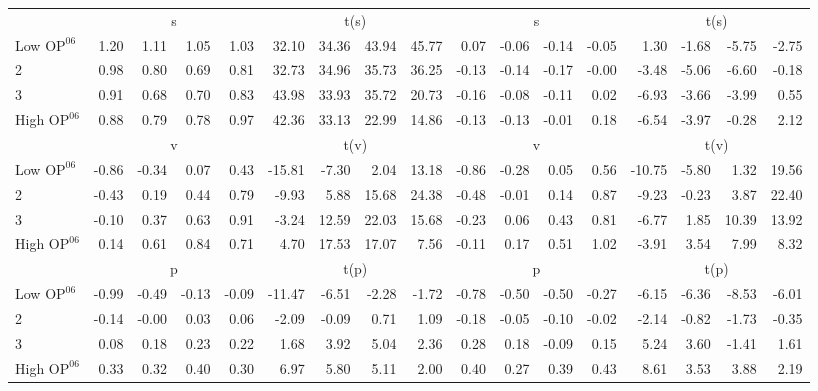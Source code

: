 \begin{table}[!ht]
\begin{tabular}{lrrrrrrrrrrrrrrrr}
  
     & \multicolumn{4}{c}{s} & \multicolumn{4}{c}{t(s)}  & \multicolumn{4}{c}{s} & \multicolumn{4}{c}{t(s)}   \\
     \cmidrule(r){2-5} \cmidrule(r){6-9}  \cmidrule(r){10-13} \cmidrule(r){14-17} 
    Low $\text{OP}^{06}$  & 1.20  & 1.11  & 1.05  & 1.03  & 32.10  & 34.36  & 43.94  & 45.77  & 0.07  & -0.06  & -0.14  & -0.05  & 1.30  & -1.68  & -5.75  & -2.75   \\
    2  & 0.98  & 0.80  & 0.69  & 0.81  & 32.73  & 34.96  & 35.73  & 36.25  & -0.13  & -0.14  & -0.17  & -0.00  & -3.48  & -5.06  & -6.60  & -0.18   \\
    3  & 0.91  & 0.68  & 0.70  & 0.83  & 43.98  & 33.93  & 35.72  & 20.73  & -0.16  & -0.08  & -0.11  & 0.02  & -6.93  & -3.66  & -3.99  & 0.55   \\
    High $\text{OP}^{06}$  & 0.88  & 0.79  & 0.78  & 0.97  & 42.36  & 33.13  & 22.99  & 14.86  & -0.13  & -0.13  & -0.01  & 0.18  & -6.54  & -3.97  & -0.28  & 2.12   \\
    
  
     & \multicolumn{4}{c}{v} & \multicolumn{4}{c}{t(v)}  & \multicolumn{4}{c}{v} & \multicolumn{4}{c}{t(v)}   \\
     \cmidrule(r){2-5} \cmidrule(r){6-9}  \cmidrule(r){10-13} \cmidrule(r){14-17} 
    Low $\text{OP}^{06}$  & -0.86  & -0.34  & 0.07  & 0.43  & -15.81  & -7.30  & 2.04  & 13.18  & -0.86  & -0.28  & 0.05  & 0.56  & -10.75  & -5.80  & 1.32  & 19.56   \\
    2  & -0.43  & 0.19  & 0.44  & 0.79  & -9.93  & 5.88  & 15.68  & 24.38  & -0.48  & -0.01  & 0.14  & 0.87  & -9.23  & -0.23  & 3.87  & 22.40   \\
    3  & -0.10  & 0.37  & 0.63  & 0.91  & -3.24  & 12.59  & 22.03  & 15.68  & -0.23  & 0.06  & 0.43  & 0.81  & -6.77  & 1.85  & 10.39  & 13.92   \\
    High $\text{OP}^{06}$  & 0.14  & 0.61  & 0.84  & 0.71  & 4.70  & 17.53  & 17.07  & 7.56  & -0.11  & 0.17  & 0.51  & 1.02  & -3.91  & 3.54  & 7.99  & 8.32   \\
    
  
     & \multicolumn{4}{c}{p} & \multicolumn{4}{c}{t(p)}  & \multicolumn{4}{c}{p} & \multicolumn{4}{c}{t(p)}   \\
     \cmidrule(r){2-5} \cmidrule(r){6-9}  \cmidrule(r){10-13} \cmidrule(r){14-17} 
    Low $\text{OP}^{06}$  & -0.99  & -0.49  & -0.13  & -0.09  & -11.47  & -6.51  & -2.28  & -1.72  & -0.78  & -0.50  & -0.50  & -0.27  & -6.15  & -6.36  & -8.53  & -6.01   \\
    2  & -0.14  & -0.00  & 0.03  & 0.06  & -2.09  & -0.09  & 0.71  & 1.09  & -0.18  & -0.05  & -0.10  & -0.02  & -2.14  & -0.82  & -1.73  & -0.35   \\
    3  & 0.08  & 0.18  & 0.23  & 0.22  & 1.68  & 3.92  & 5.04  & 2.36  & 0.28  & 0.18  & -0.09  & 0.15  & 5.24  & 3.60  & -1.41  & 1.61   \\
    High $\text{OP}^{06}$  & 0.33  & 0.32  & 0.40  & 0.30  & 6.97  & 5.80  & 5.11  & 2.00  & 0.40  & 0.27  & 0.39  & 0.43  & 8.61  & 3.53  & 3.88  & 2.19   \\
    

\end{tabular}
\end{table}
